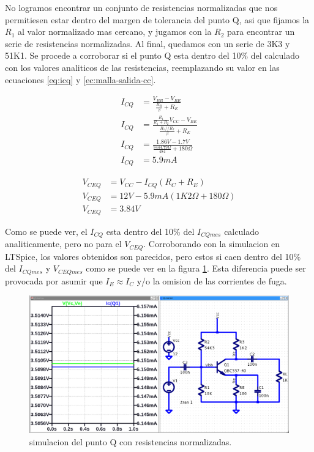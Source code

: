   No logramos encontrar un conjunto de resistencias normalizadas que nos permitiesen estar dentro del margen de
  tolerancia del punto Q, asi que fijamos la $R_1$ al valor normalizado mas cercano, y jugamos con la $R_2$ para
  encontrar un serie de resistencias normalizadas. Al final, quedamos con un serie de 3K3 y 51K1. Se procede a corroborar
  si el punto Q esta dentro del 10\% del calculado con los valores analiticos de las resistencias, reemplazando su
  valor en las ecuaciones \ref{eq:icq} y \ref{ec:malla-salida-cc}.

  \begin{figure}[!ht]
    \centering
    \begin{minipage}{0.49\textwidth}
      \begin{align*}
        I_{CQ} &= \frac{V_{BB} - V_{BE}}{\frac{R_B}{\beta} + R_E}\\[6pt]
        I_{CQ} &= \frac{\frac{R_1}{R_1 + R_2} V_{CC} - V_{BE}}{\frac{R_1//R_2}{\beta} + R_E}\\[6pt]
        I_{CQ} &= \frac{1.86V - 1.7V}{\frac{8444.79 \Omega}{484} + 180 \Omega}\\[6pt]
        I_{CQ} &= 5.9 mA
      \end{align*}
    \end{minipage}
    \begin{minipage}{0.49\textwidth}
      \begin{align*}
        V_{CEQ} &= V_{CC} - I_{CQ} \left(R_C + R_E \right)\\[6pt]
        V_{CEQ} &= 12V - 5.9mA \left(1K2 \Omega + 180 \Omega \right)\\[6pt]
        V_{CEQ} &= 3.84V
      \end{align*}
    \end{minipage}
  \end{figure}

  Como se puede ver, el $I_{CQ}$ esta dentro del 10\% del $I_{CQ mes}$ calculado analiticamente, pero no para el
  $V_{CEQ}$. Corroborando con la simulacion en LTSpice, los valores obtenidos son parecidos, pero estos si caen dentro
  del 10\% del $I_{CQ mes}$ y $V_{CEQ mes}$ como se puede ver en la figura \ref{fig:pto_q_normalizado}. Esta diferencia
  puede ser provocada por asumir que $I_E \approx I_C$ y/o la omision de las corrientes de fuga.

  \begin{figure}[!ht]
    \centering
    \includegraphics[width=.9\textwidth]{images/pto_q_normalizado.png}
    \caption{simulacion del punto Q con resistencias normalizadas.}
    \label{fig:pto_q_normalizado}
  \end{figure}


